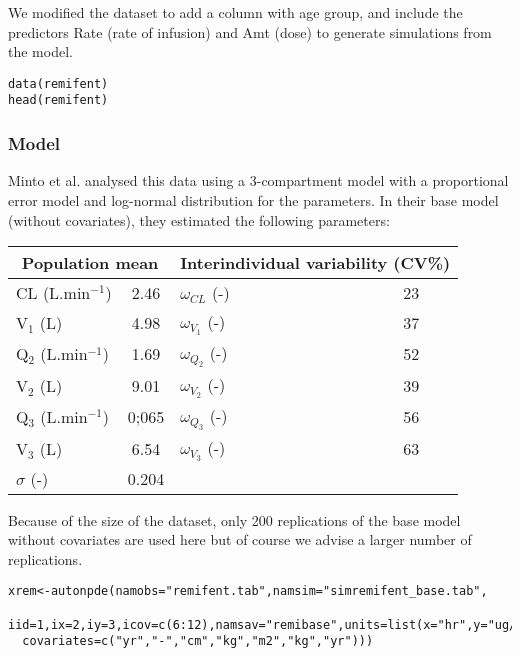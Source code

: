 We modified the dataset to add a column with age group, and include the predictors {\sf Rate} (rate of infusion) and {\sf Amt} (dose) to generate simulations from the model.
\begin{verbatim}
data(remifent)
head(remifent)
\end{verbatim} 

\subsubsection{Model}

\hskip 18pt Minto et al. analysed this data using a 3-compartment model with a proportional error model and log-normal distribution for the parameters. In their base model (without covariates), they estimated the following parameters:

\begin{center}
\begin{tabular} {l c | l c}
\hline 
\multicolumn{2}{c}{Population mean} & \multicolumn{2}{c}{Interindividual variability (CV\%)} \\
\hline 
CL (L.min$^{-1}$) & 2.46 & $\omega_{CL}$ (-) & 23 \\
V$_1$ (L) & 4.98 & $\omega_{V_1}$ (-) & 37 \\
Q$_2$ (L.min$^{-1}$) & 1.69 & $\omega_{Q_2}$ (-) & 52 \\
V$_2$ (L) & 9.01 & $\omega_{V_2}$ (-) & 39 \\
Q$_3$ (L.min$^{-1}$) & 0;065 & $\omega_{Q_3}$ (-) & 56 \\
V$_3$ (L) & 6.54 & $\omega_{V_3}$ (-) & 63 \\
$\sigma$ (-) & 0.204 \\
\hline
\end{tabular}
\end{center}

Because of the size of the dataset, only 200 replications of the base model without covariates are used here but of course we advise a larger number of replications.
\begin{verbatim}
xrem<-autonpde(namobs="remifent.tab",namsim="simremifent_base.tab",
  iid=1,ix=2,iy=3,icov=c(6:12),namsav="remibase",units=list(x="hr",y="ug/L",
  covariates=c("yr","-","cm","kg","m2","kg","yr")))
\end{verbatim}


